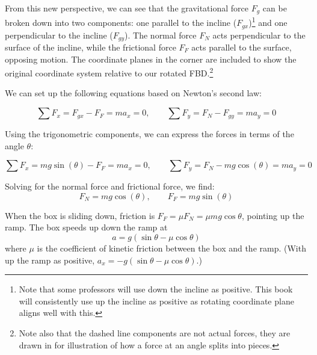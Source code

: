 From this new perspective, we can see that the gravitational force $F_g$ can be broken down into two components: one parallel to the incline ($F_{gx}$)\footnote{Note that some professors will use down the incline as positive. This book will consistently use up the incline as positive as rotating coordinate plane aligns well with this.} and one perpendicular to the incline ($F_{gy}$). The normal force $F_N$ acts perpendicular to the surface of the incline, while the frictional force $F_F$ acts parallel to the surface, opposing motion. The coordinate planes in the corner are included to show the original coordinate system relative to our rotated FBD.\footnote{Note also that the dashed line components are not actual forces, they are drawn in for illustration of how a force at an angle splits into pieces.}
  
We can set up the following equations based on Newton's second law:

$$\sum F_x = F_{gx} - F_F = m a_x = 0,\qquad \sum F_y = F_N - F_{gy} = m a_y = 0$$

Using the trigonometric components, we can express the forces in terms of the angle $\theta$:

$$\sum F_x = mg\sin(\theta) - F_F = m a_x = 0,\qquad \sum F_y = F_N - mg\cos(\theta) = m a_y = 0$$

Solving for the normal force and frictional force, we find:
$$F_N = mg\cos(\theta),\qquad F_F = mg\sin(\theta)$$

When the box is sliding down, friction is $F_F = \mu F_N = \mu mg\cos\theta$, pointing up the ramp. The box speeds up down the ramp at
$$a = g(\sin\theta - \mu \cos\theta)$$
where $\mu$ is the coefficient of kinetic friction between the box and the ramp. (With up the ramp as positive, $a_x = -g(\sin\theta - \mu \cos\theta)$.)

